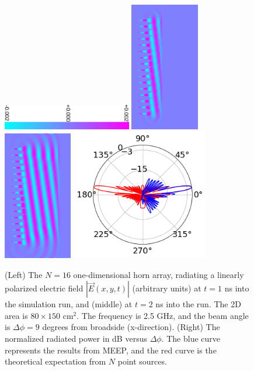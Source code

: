 \documentclass[../../main.tex]{subfiles}
\begin{document}
\begin{figure}
\centering
\includegraphics[width=5.625cm,angle=90]{figures/fields/colorbar.pdf}
\includegraphics[width=3cm]{figures/fields/ey_phase_horn_t30.png}
\includegraphics[width=3cm]{figures/fields/ey_phase_horn_t60.png}
\includegraphics[width=6cm]{figures/fields/rad_patt_field.png}
\caption{\label{fig:1dhornresults2} (Left) The $N = 16$ one-dimensional horn array, radiating a linearly polarized electric field $|\vec{E}(x,y,t)|$ (arbitrary units) at $t = 1$ ns into the simulation run, and (middle) at $t = 2$ ns into the run.  The 2D area is $80 \times 150$ cm$^2$.  The frequency is 2.5 GHz, and the beam angle is $\Delta \phi = 9$ degrees from broadside (x-direction). (Right) The normalized radiated power in dB versus $\Delta \phi$.  The blue curve represents the results from MEEP, and the red curve is the theoretical expectation from $N$ point sources.}
\end{figure}
\end{document}
